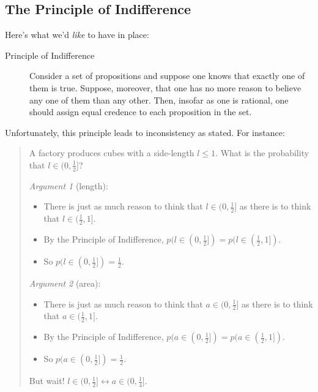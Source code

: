 \documentclass[12pt]{extarticle}
\begin{document}
\subsection{The Principle of Indifference}

Here's what we'd \emph{like} to have in place:


\begin{description}
\item[Principle of Indifference]
Consider a set of propositions and suppose one knows that exactly one of them is true. Suppose, moreover, that one has no more reason to believe any one of them than any other. Then, insofar as one is rational, one should assign equal credence to each proposition in the set.

\end{description}
Unfortunately, this principle leads to inconsistency as stated. For instance:
\begin{quote}
A factory produces cubes with a side-length $l \leq 1$. What is the probability
that $l \in (0,\frac{1}{2}]$?



\emph{Argument 1} (length):
\begin{itemize}

\item There is just as much reason to think that $l \in (0,\frac{1}{2}]$ as there is to think that $l \in (\frac{1}{2},1]$. 

\item By the Principle of Indifference, $p(l \in (0,\frac{1}{2}]) = p(l \in (\frac{1}{2},1])$. 

\item So $p(l \in (0,\frac{1}{2}]) = \frac{1}{2}$.


\end{itemize}


\emph{Argument 2} (area):
\begin{itemize}

\item There is just as much reason to think that $a \in (0,\frac{1}{2}]$ as there is to think that $a \in (\frac{1}{2},1]$. 

\item By the Principle of Indifference, $p(a \in (0,\frac{1}{2}]) = p(a \in (\frac{1}{2},1])$. 

\item So $p(a \in (0,\frac{1}{2}]) = \frac{1}{2}$.


\end{itemize}
But wait! $l \in (0,\frac{1}{2}] \leftrightarrow a \in (0,\frac{1}{4}]$.

\end{quote}
\end{document}
